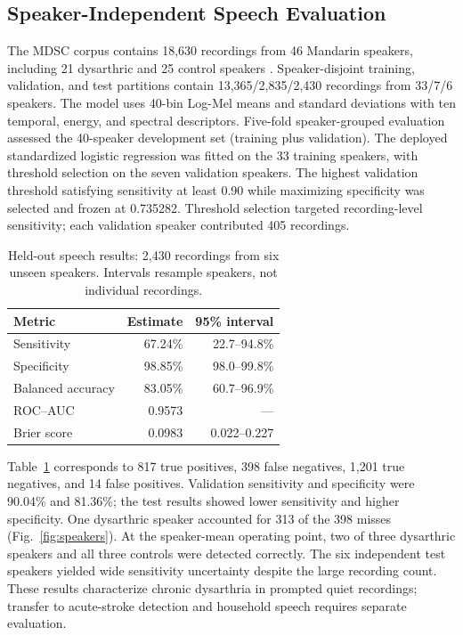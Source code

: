 \subsection{Speaker-Independent Speech Evaluation}
The MDSC corpus contains 18,630 recordings from 46 Mandarin speakers, including
21 dysarthric and 25 control speakers \cite{gao2024mdsc}. Speaker-disjoint
training, validation, and test partitions contain 13,365/2,835/2,430 recordings
from 33/7/6 speakers. The model uses 40-bin Log-Mel means and standard deviations
with ten temporal, energy, and spectral descriptors. Five-fold speaker-grouped evaluation assessed the 40-speaker development set (training plus validation). The deployed standardized logistic regression was fitted on the 33 training speakers, with threshold selection on the seven validation speakers. The highest validation threshold satisfying sensitivity
at least 0.90 while maximizing specificity was selected and frozen at 0.735282.
Threshold selection targeted recording-level sensitivity; each validation speaker contributed 405 recordings.

\begin{table}[htbp]
\centering\footnotesize
\caption{Held-out speech results: 2,430 recordings from six unseen speakers.
Intervals resample speakers, not individual recordings.}
\label{tab:model_performance}
\begin{tabular}{@{}lrr@{}}\toprule
Metric & Estimate & 95\% interval \\\midrule
Sensitivity & 67.24\% & 22.7--94.8\% \\
Specificity & 98.85\% & 98.0--99.8\% \\
Balanced accuracy & 83.05\% & 60.7--96.9\% \\
ROC--AUC & 0.9573 & --- \\
Brier score & 0.0983 & 0.022--0.227 \\
\bottomrule\end{tabular}
\end{table}

Table~\ref{tab:model_performance} corresponds to 817 true positives, 398 false
negatives, 1,201 true negatives, and 14 false positives. Validation sensitivity
and specificity were 90.04\% and 81.36\%; the test results showed lower sensitivity
and higher specificity. One dysarthric speaker accounted for 313 of the 398 misses
(Fig.~\ref{fig:speakers}).
At the speaker-mean operating point, two of three dysarthric speakers and all
three controls were detected correctly. The six independent test speakers yielded wide sensitivity uncertainty despite the large recording count. These results characterize chronic dysarthria in prompted quiet recordings; transfer to acute-stroke detection and household speech requires separate evaluation.

